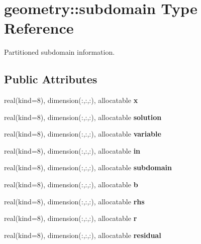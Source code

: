\hypertarget{structgeometry_1_1subdomain}{}\section{geometry\+:\+:subdomain Type Reference}
\label{structgeometry_1_1subdomain}


Partitioned subdomain information.  


\subsection*{Public Attributes}
\begin{DoxyCompactItemize}
\item 
\mbox{\label{structgeometry_1_1subdomain_aea7753c3a62cce4a5c8ca8f6bce7e965}} 
real(kind=8), dimension(\+:,\+:,\+:), allocatable {\bfseries x}
\item 
\mbox{\label{structgeometry_1_1subdomain_aeeeb5d9f5e919e5d674452cec8d790df}} 
real(kind=8), dimension(\+:,\+:,\+:), allocatable {\bfseries solution}
\item 
\mbox{\label{structgeometry_1_1subdomain_a701a6ba5307a85562218bc465772fa20}} 
real(kind=8), dimension(\+:,\+:,\+:), allocatable {\bfseries variable}
\item 
\mbox{\label{structgeometry_1_1subdomain_a98470eff2217eaa32f1169c2233a8d01}} 
real(kind=8), dimension(\+:,\+:,\+:), allocatable {\bfseries in}
\item 
\mbox{\label{structgeometry_1_1subdomain_ae9181672b7a5e402c32d45a58b05c907}} 
real(kind=8), dimension(\+:,\+:,\+:), allocatable {\bfseries subdomain}
\item 
\mbox{\label{structgeometry_1_1subdomain_a998dfed0dc2c8a52f074267ebbedbeb1}} 
real(kind=8), dimension(\+:,\+:,\+:), allocatable {\bfseries b}
\item 
\mbox{\label{structgeometry_1_1subdomain_a92a7a57f937604398d2208eed5a1c39b}} 
real(kind=8), dimension(\+:,\+:,\+:), allocatable {\bfseries rhs}
\item 
\mbox{\label{structgeometry_1_1subdomain_a30c3dad173fc5e40edc8b540a71083c5}} 
real(kind=8), dimension(\+:,\+:,\+:), allocatable {\bfseries r}
\item 
\mbox{\label{structgeometry_1_1subdomain_a064448f084292cb4a38046bd276c970a}} 
real(kind=8), dimension(\+:,\+:,\+:), allocatable {\bfseries residual}
\end{DoxyCompactItemize}
